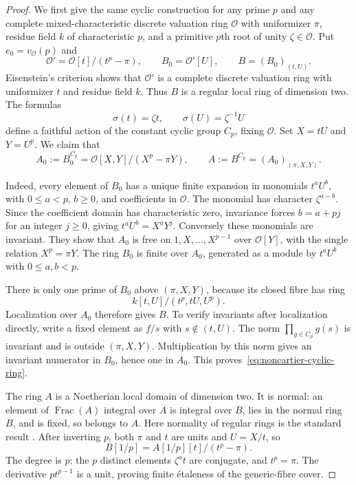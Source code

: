 \begin{proof}
We first give the same cyclic construction for any prime $p$ and any complete
mixed-characteristic discrete valuation ring $\mathcal O$ with
uniformizer $\pi$, residue field $k$ of characteristic $p$, and a
primitive $p$th root of unity $\zeta\in\mathcal O$.
Put $e_0=v_{\mathcal O}(p)$ and
\[
 \mathcal O'=\mathcal O[t]/(t^p-\pi),\qquad
 B_0=\mathcal O'[U],\qquad B=(B_0)_{(t,U)}.
\]
Eisenstein's criterion shows that $\mathcal O'$ is a complete discrete
valuation ring with uniformizer $t$ and residue field $k$.
Thus $B$ is a regular local ring of dimension two. The formulas
\[
                 \sigma(t)=\zeta t,\qquad
                 \sigma(U)=\zeta^{-1}U
\]
define a faithful action of the constant cyclic group $C_p$, fixing
$\mathcal O$. Set $X=tU$ and $Y=U^p$. We claim that
\begin{equation}
 A_0:=B_0^{C_p}=\mathcal O[X,Y]/(X^p-\pi Y),\qquad
 A:=B^{C_p}=(A_0)_{(\pi,X,Y)}.
\label{eq:noncartier-cyclic-ring}
\end{equation}

Indeed, every element of $B_0$ has a unique finite expansion in monomials
$t^aU^b$, with $0\le a<p$, $b\ge0$, and coefficients in $\mathcal O$.
The monomial has character $\zeta^{a-b}$. Since the coefficient domain
has characteristic zero, invariance forces $b=a+pj$ for an integer
$j\ge0$, giving $t^aU^b=X^aY^j$.
Conversely these monomials are invariant. They show that $A_0$ is free
on $1,X,\ldots,X^{p-1}$ over $\mathcal O[Y]$, with the single relation
$X^p=\pi Y$. The ring $B_0$ is finite over $A_0$, generated as a module
by $t^aU^b$ with $0\le a,b<p$.

There is only one prime of $B_0$ above $(\pi,X,Y)$, because its closed
fibre has ring
\[
                         k[t,U]/(t^p,tU,U^p).
\]
Localization over $A_0$ therefore gives $B$.
To verify invariants after localization directly, write a fixed
element as $f/s$ with $s\notin(t,U)$. The norm
$\prod_{g\in C_p}g(s)$ is invariant and is outside $(\pi,X,Y)$.
Multiplication by this norm gives an invariant numerator in $B_0$,
hence one in $A_0$. This proves~\eqref{eq:noncartier-cyclic-ring}.

The ring $A$ is a Noetherian local domain of dimension two. It is normal:
an element of $\operatorname{Frac}(A)$ integral over $A$ is integral over
$B$, lies in the normal ring $B$, and is fixed, so belongs to $A$.
Here normality of regular rings is the standard result
\cite[Lemma~10.157.5]{StacksRegularNormal}.
After inverting $p$, both $\pi$ and $t$ are units and $U=X/t$, so
\[
                    B[1/p]=A[1/p][t]/(t^p-\pi).
\]
The degree is $p$: the $p$ distinct elements $\zeta^a t$ are conjugate,
and $t^p=\pi$. The derivative $pt^{p-1}$ is a unit, proving finite
\'etaleness of the generic-fibre cover.


\end{proof}
